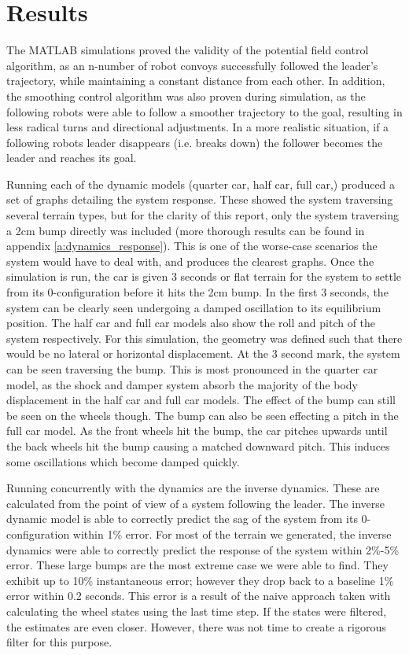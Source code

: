 \chapter{Results}
The MATLAB simulations proved the validity of the potential field control algorithm, as an n-number of robot convoys successfully followed the leader's trajectory, while maintaining a constant distance from each other. In addition, the smoothing control algorithm was also proven during simulation, as the following robots were able to follow a smoother trajectory to the goal, resulting in less radical turns and directional adjustments. In a more realistic situation, if a following robots leader disappears (i.e. breaks down) the follower becomes the leader and reaches its goal.

Running each of the dynamic models (quarter car, half car, full car,) produced a set of graphs detailing the system response. These showed the system traversing several terrain types, but for the clarity of this report, only the system traversing a 2cm bump directly was included (more thorough results can be found in appendix \ref{a:dynamics_response}). This is one of the worse-case scenarios the system would have to deal with, and produces the clearest graphs. Once the simulation is run, the car is given 3 seconds or flat terrain for the system to settle from its 0-configuration before it hits the 2cm bump. In the first 3 seconds, the system can be clearly seen undergoing a damped oscillation to its equilibrium position. The half car and full car models also show the roll and pitch of the system respectively. For this simulation, the geometry was defined such that there would be no lateral or horizontal displacement. At the 3 second mark, the system can be seen traversing the bump. This is most pronounced in the quarter car model, as the shock and damper system absorb the majority of the body displacement in the half car and full car models. The effect of the bump can still be seen on the wheels though. The bump can also be seen effecting a pitch in the full car model. As the front wheels hit the bump, the car pitches upwards until the back wheels hit the bump causing a matched downward pitch. This induces some oscillations which become damped quickly.

Running concurrently with the dynamics are the inverse dynamics. These are calculated from the point of view of a system following the leader. The inverse dynamic model is able to correctly predict the sag of the system from its 0-configuration within 1\% error. For most of the terrain we generated, the inverse dynamics were able to correctly predict the response of the system within 2\%-5\% error. These large bumps are the most extreme case we were able to find. They exhibit up to 10\% instantaneous error; however they drop back to a baseline 1\% error within 0.2 seconds. This error is a result of the naive approach taken with calculating the wheel states using the last time step. If the states were filtered, the estimates are even closer. However, there was not time to create a rigorous filter for this purpose.

